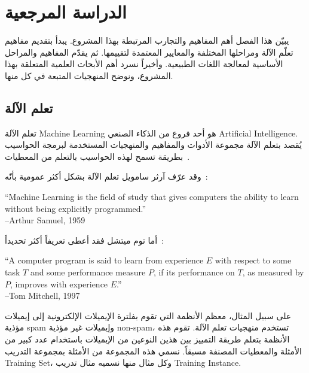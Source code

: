 


\chapter{الدراسة المرجعية}
يبيّن هذا الفصل أهم المفاهيم والتجارب المرتبطة بهذا المشروع.
يبدأ بتقديم مفاهيم تعلّم الآلة ومراحلها المختلفة والمعايير المعتمدة لتقييمها.
ثم يقدّم المفاهيم والمراحل الأساسية لمعالجة اللغات الطبيعية.
وأخيراً نسرد أهم الأبحاث العلمية المتعلقة بهذا المشروع، ونوضح المنهجيات المتبعة في كل منها.







\section{تعلم الآلة}
\label{sec:ml}
تعلم الآلة \textenglish{Machine Learning} هو أحد فروع من الذكاء الصنعي \textenglish{Artificial Intelligence}.
يُقصد بتعلم الآلة مجموعة الأدوات والمفاهيم والمنهجيات المستخدمة لبرمجة الحواسيب
بطريقة تسمح لهذه الحواسيب بالتعلم من المعطيات~\cite{hands-on}.

وقد عرّف آرثر سامويل تعلم الآلة بشكل أكثر عمومية بأنّه~\cite{hands-on}:

\begin{english}
	``Machine Learning is the field of study that gives computers the ability to learn
	without being explicitly programmed.'' \\
	--Arthur Samuel, 1959
\end{english}

أما توم ميتشل فقد أعطى تعريفاً أكثر تحديداً~\cite{hands-on}:

\begin{english}
	``A computer program is said to learn from experience $E$ with respect to some task $T$
	and some performance measure $P$, if its performance on $T$, as measured by $P$, improves
	with experience $E$.'' \\
	--Tom Mitchell, 1997
\end{english}

على سبيل المثال، معظم الأنظمة التي تقوم بفلترة الإيميلات الإلكترونية إلى إيميلات مؤذية \textenglish{spam} 
وإيميلات غير مؤذية \textenglish{non-spam}، تستخدم منهجيات تعلم الآلة.
تقوم هذه الأنظمة بتعلم طريقة التمييز بين هذين النوعين من الإيميلات باستخدام عدد كبير من الأمثلة والمعطيات المصنفة مسبقاً.
نسمي هذه المجموعة من الأمثلة بمجموعة التدريب \textenglish{Training Set}، وكل مثال منها نسميه مثال تدريب \textenglish{Training Instance}.

